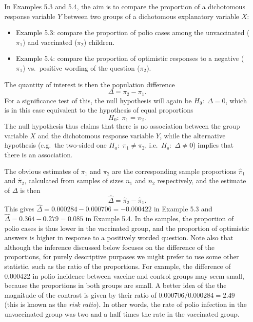 In Examples 5.3 and 5.4, the aim is to compare the
proportion of a dichotomous response variable $Y$ between two groups of a
dichotomous explanatory variable $X$:
\begin{itemize}
\item
Example 5.3: compare the proportion of polio cases among the
unvaccinated ($\pi_{1}$) and vaccinated ($\pi_{2}$) children.
\item
Example 5.4: compare
the proportion of
optimistic responses to a negative ($\pi_{1}$)
vs.\ positive wording of the question ($\pi_{2}$).
\end{itemize}
The quantity of interest is then the population difference
\begin{equation}
\Delta=\pi_{2}-\pi_{1}.
\label{Dp2sample}
\end{equation}
For a significance test of this, the null hypothesis will again be $H_{0}:\; \Delta=0$,
which is in this case equivalent to the hypothesis of equal proportions
\begin{equation}
H_{0}:\; \pi_{1} = \pi_{2}.
\label{H0pD}
\end{equation}
The null hypothesis thus claims that there is no association between
the group variable $X$ and the dichotomous response variable $Y$,
while the alternative hypothesis
(e.g.\  the two-sided one
$H_{a}:\; \pi_{1}\ne \pi_{2}$, i.e.\ $H_{a}:\; \Delta\ne
0$) implies that there is an association.

The obvious estimates of $\pi_{1}$ and $\pi_{2}$ are
the corresponding sample proportions $\hat{\pi}_{1}$ and
$\hat{\pi}_{2}$, calculated from samples of sizes $n_{1}$ and $n_{2}$
respectively, and the estimate of $\Delta$ is then
\begin{equation}
\hat{\Delta}=\hat{\pi}_{2} - \hat{\pi}_{1}.
\label{Dhatpi}
\end{equation}
This gives $\hat{\Delta}=0.000284-0.000706=-0.000422$ in Example 5.3 and
$\hat{\Delta}=0.364-0.279=0.085$ in Example 5.4.
In the samples, the proportion of
polio cases is thus lower in the vaccinated group, and the proportion of
optimistic answers is higher in response to a positively worded
question. Note also that although the inference discussed below focuses
on the difference of the proportions,
for purely descriptive purposes
we might prefer to use some other statistic,
such as the ratio of the proportions.
For example, the difference of 0.000422 in polio
incidence between vaccine and control groups may seem small, because the
proportions in both groups are small. A better idea of the the magnitude
of the contrast is given by their ratio of $0.000706/0.000284=2.49$
(this is known as the \emph{risk ratio}). In other words, the rate of
polio infection in the unvaccinated group was two and a half times the
rate in the vaccinated group.

